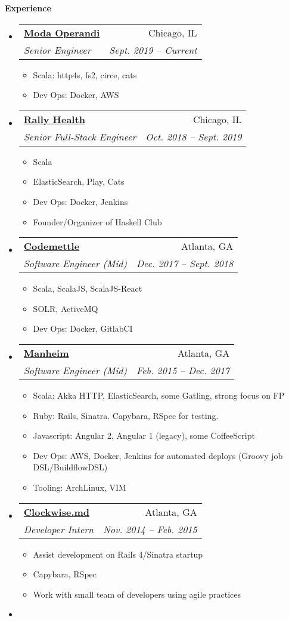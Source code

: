 \documentclass[letterpaper,11pt]{article}
\makeatletter
\newcommand{\resitem}[1]{\item #1 \vspace{-2pt}}
\newcommand{\resheading}[1]{{\large \colorbox{mygrey}{\begin{minipage}{\textwidth}{\textbf{#1 \vphantom{p\^{E}}}}\end{minipage}}}}
\newcommand{\ressubheading}[4]{
\begin{tabular*}{6.5in}{l@{\extracolsep{\fill}}r}
		\textbf{#1} & #2 \\
		\textit{#3} & \textit{#4} \\
\end{tabular*}\vspace{-6pt}}
\makeatother
\begin{document}
\resheading{Experience}
\begin{itemize}
\item
  \ressubheading{\href{http://www.modaoperandi.com/}{Moda Operandi}}{Chicago, IL}{Senior Engineer}{Sept. 2019 -- Current}
    { \footnotesize
    \begin{itemize}
        \resitem{Scala: http4s, fs2, circe, cats}
        \resitem{Dev Ops: Docker, AWS}
    \end{itemize}
    }
\item
  \ressubheading{\href{http://www.rallyhealth.com/}{Rally Health}}{Chicago, IL}{Senior Full-Stack Engineer}{Oct. 2018 -- Sept. 2019}
    { \footnotesize
    \begin{itemize}
        \resitem{Scala}
        \resitem{ElasticSearch, Play, Cats}
        \resitem{Dev Ops: Docker, Jenkins}
        \resitem{Founder/Organizer of Haskell Club}
    \end{itemize}
    }
\item
  \ressubheading{\href{http://www.codemettle.com/}{Codemettle}}{Atlanta, GA}{Software Engineer (Mid)}{Dec. 2017 -- Sept. 2018}
    { \footnotesize
    \begin{itemize}
        \resitem{Scala, ScalaJS, ScalaJS-React}
        \resitem{SOLR, ActiveMQ}
        \resitem{Dev Ops: Docker, GitlabCI}
    \end{itemize}
    }
\item
  \ressubheading{\href{http://www.manheim.com/}{Manheim}}{Atlanta, GA}{Software Engineer (Mid)}{Feb. 2015 -- Dec. 2017}
    { \footnotesize
    \begin{itemize}
        \resitem{Scala: Akka HTTP, ElasticSearch, some Gatling, strong focus on FP}
        \resitem{Ruby: Rails, Sinatra. Capybara, RSpec for testing.}
        \resitem{Javascript: Angular 2, Angular 1 (legacy), some CoffeeScript}
        \resitem{Dev Ops: AWS, Docker, Jenkins for automated deploys (Groovy job DSL/BuildflowDSL)}
        \resitem{Tooling: ArchLinux, VIM}
    \end{itemize}
    }
\item
\ressubheading{\href{http://www.clockwise.md/}{Clockwise.md}}{Atlanta, GA}{Developer Intern}{Nov. 2014 -- Feb. 2015}
    { \footnotesize
    \begin{itemize}
        \resitem{Assist development on Rails 4/Sinatra startup}
        \resitem{Capybara, RSpec}
        \resitem{Work with small team of developers using agile practices}
    \end{itemize}
    }
\item

\end{itemize}
\end{document}
